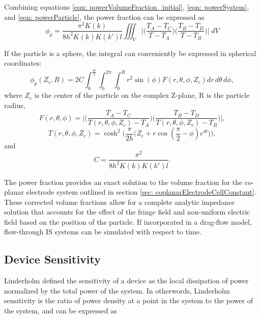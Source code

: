 Combining equations \ref{eqn: powerVolumeFraction_initial}, \ref{eqn: powerSystem}, and \ref{eqn: powerParticle}, the power fraction can be expressed as
\begin{equation}
    \phi_p = \frac{\pi^2 K(k)}{8h^2K(k)K(k')l}\iiint_V \bigg|\bigg(\frac{T_A-T_C}{T-T_A}\bigg)\bigg(\frac{T_B-T_D}{T-T_B}\bigg)\bigg| \;dV
\end{equation}

\par If the particle is a sphere, the integral can conveniently be expressed in spherical coordinates:
\begin{equation}
    \phi_p(Z_c,R) = 2C\int_{0}^\frac{pi}{2}\int_0^{2\pi}\int_0^R r^2 \sin(\phi)F(r,\theta,\phi,Z_c)dr\,d\theta\,d\phi,
\end{equation}
\noindent where $Z_c$ is the center of the particle on the complex Z-plane, R is the particle radius,
\begin{equation}
    F(r,\theta,\phi) = \bigg|\bigg(\frac{T_A-T_C}{T(r,\theta,\phi,Z_c)-T_A}\bigg)\bigg(\frac{T_B-T_D}{T(r,\theta,\phi,Z_c)-T_B}\bigg)\bigg|,
\end{equation}
\begin{equation}
    T(r,\theta,\phi,Z_c) = \cosh^2\bigg(\frac{\pi}{2h}\Big(Z_c+r\cos(\frac{\pi}{2}-\phi)e^{i\theta}\Big)\bigg),
\end{equation}
\noindent and
\begin{equation}
    C = \frac{\pi^2}{8h^2K(k)K(k')l}.
\end{equation}

\par The power fraction provides an exact solution to the volume fraction for the co-planar electrode system outlined in section \ref{sec: coplanarElectrodeCellConstant}. These corrected volume fractions allow for a complete analytic impedance solution that accounts for the effect of the fringe field and non-uniform electric field based on the position of the particle. If incorporated in a drag-flow model, flow-through IS systems can be simulated with respect to time.


\subsection{Device Sensitivity}
\par Linderholm defined the sensitivity of a device as the local dissipation of power normalized by the total power of the system. In otherwords, Linderholm sensitivity is the ratio of power density at a point in the system to the power of the system, and can be expressed as

